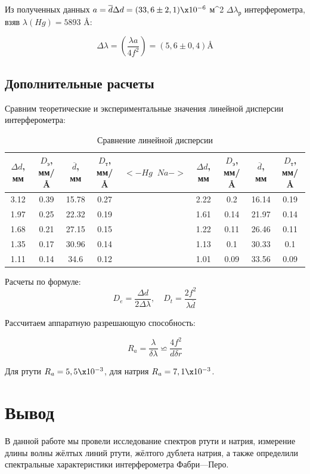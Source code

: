 \documentclass[a4paper, 12pt]{article}%
\begin{document}
\item Из полученных данных $ a = \overline{d} \Delta d = (33,6 \pm 2,1) \x 10^{-6} $ м^2  \:  $ \Delta \lambda_р  $ интерферометра, взяв $ \lambda(Hg) =  5893 $ \AA :

	\[\Delta \lambda = (\dfrac{\lambda a}{4f^2}) = (5,6 \pm 0,4) \text{\AA}\]

	\subsection{Дополнительные расчеты}
	
\item Сравним теоретические и экспериментальные значения линейной дисперсии интерферометра:
	
	\begin{table}[h!]
		\caption{Сравнение линейной дисперсии}
		\begin{center}
			\begin{tabular}{|c|c|c|c|c|c|c|c|c|}
				\hline
				$ \Delta d $, мм & $ D_э $, мм/\AA & 	$ \overline{d} $, мм & $ D_т $, мм/\AA  & $ <- Hg \; \; Na ->	 $&$ \Delta d $, мм & $ D_э $, мм/\AA & 	$ \overline{d} $, мм & $ D_т $, мм/\AA     \\
				\hline
			3.12 & 0.39 & 15.78 & 0.27 & & 2.22 & 0.2 & 16.14 & 0.19 \\
			1.97 & 0.25 & 22.32 & 0.19 & & 1.61 & 0.14 & 21.97 & 0.14 \\
			1.68 & 0.21 & 27.15 & 0.15 & & 1.22 & 0.11 & 26.46 & 0.11 \\
			1.35 & 0.17 & 30.96 & 0.14 & &1.13 & 0.1 & 30.33 & 0.1 \\
			1.11 & 0.14 & 34.6 & 0.12 & &1.01 & 0.09 & 33.56 & 0.09 \\
				\hline
			\end{tabular}
		\end{center}
		\label{}
	\end{table}
	Расчеты по формуле:
	\[D_e = \dfrac{\Delta d}{2 \Delta \lambda}, \quad D_t = \dfrac{2f^2}{\lambda \overline{d}}\]
	
	Рассчитаем аппаратную разрешающую способность:
	

	\[R_a = \dfrac{\lambda}{\delta \lambda} \backsimeq \dfrac{4f^2}{d \delta r}\]

	
	Для ртути $ R_a = 5,5 \x 10^{-3} $, для натрия $ R_a = 7,1 \x 10^{-3} $.


\section{Вывод}

В данной работе мы провели исследование спектров ртути и натрия, измерение длины волны жёлтых линий ртути, жёлтого дублета натрия, а также определили спектральные характеристики интерферометра Фабри—Перо. 
\end{document}
